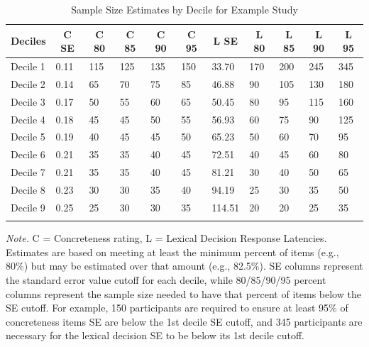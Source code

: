 \documentclass[
  man]{apa7}
\begin{document}
\begin{table}[tbp]

\begin{center}
\begin{threeparttable}

\caption{\label{tab:table-example}Sample Size Estimates by Decile for Example Study}

\begin{tabular}{lllllllllll}
\toprule
Deciles & \multicolumn{1}{c}{C SE} & \multicolumn{1}{c}{C 80} & \multicolumn{1}{c}{C 85} & \multicolumn{1}{c}{C 90} & \multicolumn{1}{c}{C 95} & \multicolumn{1}{c}{L SE} & \multicolumn{1}{c}{L 80} & \multicolumn{1}{c}{L 85} & \multicolumn{1}{c}{L 90} & \multicolumn{1}{c}{L 95}\\
\midrule
Decile 1 & 0.11 & 115 & 125 & 135 & 150 & 33.70 & 170 & 200 & 245 & 345\\
Decile 2 & 0.14 & 65 & 70 & 75 & 85 & 46.88 & 90 & 105 & 130 & 180\\
Decile 3 & 0.17 & 50 & 55 & 60 & 65 & 50.45 & 80 & 95 & 115 & 160\\
Decile 4 & 0.18 & 45 & 45 & 50 & 55 & 56.93 & 60 & 75 & 90 & 125\\
Decile 5 & 0.19 & 40 & 45 & 45 & 50 & 65.23 & 50 & 60 & 70 & 95\\
Decile 6 & 0.21 & 35 & 35 & 40 & 45 & 72.51 & 40 & 45 & 60 & 80\\
Decile 7 & 0.21 & 35 & 35 & 40 & 45 & 81.21 & 30 & 40 & 50 & 65\\
Decile 8 & 0.23 & 30 & 30 & 35 & 40 & 94.19 & 25 & 30 & 35 & 50\\
Decile 9 & 0.25 & 25 & 30 & 30 & 35 & 114.51 & 20 & 20 & 25 & 35\\
\bottomrule
\addlinespace
\end{tabular}

\begin{tablenotes}[para]
\normalsize{\textit{Note.} C = Concreteness rating, L = Lexical Decision Response Latencies. Estimates are based on meeting at least the minimum percent of items (e.g., 80\%) but may be estimated over that amount (e.g., 82.5\%). SE columns represent the standard error value cutoff for each decile, while 80/85/90/95 percent columns represent the sample size needed to have that percent of items below the SE cutoff. For example, 150 participants are required to ensure at least 95\% of concreteness items SE are below the 1st decile SE cutoff, and 345 participants are necessary for the lexical decision SE to be below its 1st decile cutoff.}
\end{tablenotes}

\end{threeparttable}
\end{center}

\end{table}
\end{document}
